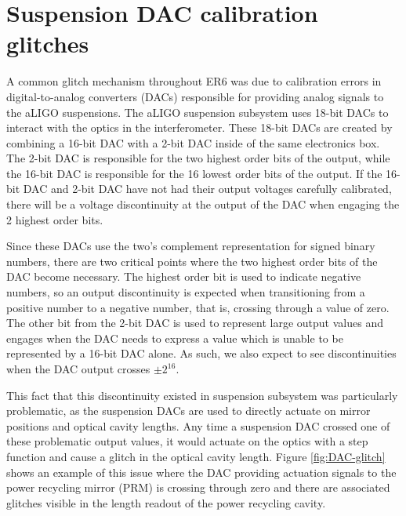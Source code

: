 \section{Suspension DAC calibration glitches}

A common glitch mechanism throughout ER6 was due to calibration errors in 
digital-to-analog converters (DACs) responsible for providing analog signals 
to the aLIGO suspensions. The aLIGO suspension subsystem uses 18-bit DACs 
to interact with the optics in the interferometer. These 18-bit DACs are 
created by combining a 16-bit DAC with a 2-bit DAC inside of the same 
electronics box. The 2-bit DAC is responsible for the two highest order 
bits of the output, while the 16-bit DAC is responsible for the 16 lowest 
order bits of the output. If the 16-bit DAC and 2-bit DAC have not had 
their output voltages carefully calibrated, there will be a voltage discontinuity 
at the output of the DAC when engaging the 2 highest order bits. 

Since these DACs use the two's complement 
representation for signed binary numbers, there are two critical points 
where the two highest order bits of the DAC become necessary. The highest 
order bit is used to indicate negative numbers, so an output discontinuity 
is expected when transitioning from a positive number to a negative number, 
that is, crossing through a value of zero.  
The other bit from the 2-bit DAC is used to represent large output values and 
engages when the DAC needs to express a value which is unable to be 
represented by a 16-bit DAC alone. As such, we also 
expect to see discontinuities when the DAC output crosses $\pm2^16$. 

This fact that this discontinuity existed in suspension subsystem was 
particularly problematic, as the suspension DACs are used to directly 
actuate on mirror positions and optical cavity lengths. Any time a 
suspension DAC crossed one of these problematic output values, it would 
actuate on the optics with a step function and cause a glitch in the 
optical cavity length. Figure \ref{fig:DAC-glitch} shows an example of 
this issue where the DAC providing actuation signals to the power recycling 
mirror (PRM) is crossing through zero and there are associated glitches 
visible in the length readout of the power recycling cavity.

